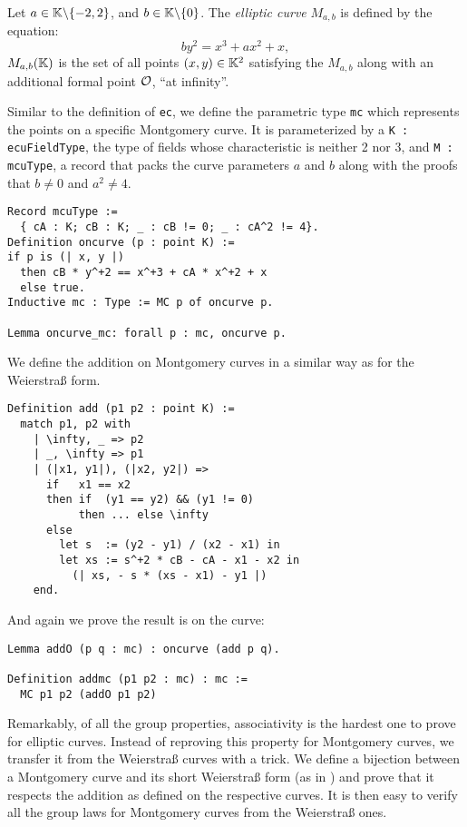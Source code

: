 \begin{dfn}
  Let $a \in \mathbb{K} \backslash \{-2, 2\}$, and $b \in \mathbb{K} \backslash \{ 0\}$.
  The \textit{elliptic curve} $M_{a,b}$ is defined by the equation:
  $$by^2 = x^3 + ax^2 + x,$$
  $M_{a,b}(\mathbb{K})$ is the set of all points $(x,y) \in \mathbb{K}^2$ satisfying the $M_{a,b}$
  along with an additional formal point $\mathcal{O}$, ``at infinity''.
\end{dfn}
Similar to the definition of \texttt{ec}, we define the parametric type \texttt{mc} which
represents the points on a specific Montgomery curve.
It is parameterized by
a \texttt{K : ecuFieldType}, the type of fields whose characteristic is neither
2 nor 3, and \texttt{M : mcuType}, a record that packs the curve
parameters $a$ and $b$ along with the proofs that $b \neq 0$ and $a^2 \neq 4$.
\begin{lstlisting}[language=Coq,belowskip=-0.1 \baselineskip]
Record mcuType :=
  { cA : K; cB : K; _ : cB != 0; _ : cA^2 != 4}.
Definition oncurve (p : point K) :=
if p is (| x, y |)
  then cB * y^+2 == x^+3 + cA * x^+2 + x
  else true.
Inductive mc : Type := MC p of oncurve p.

Lemma oncurve_mc: forall p : mc, oncurve p.
\end{lstlisting}
We define the addition on Montgomery curves in a similar way as for the Weierstra{\ss} form.
\begin{lstlisting}[language=Coq,belowskip=-0.25 \baselineskip]
Definition add (p1 p2 : point K) :=
  match p1, p2 with
    | \infty, _ => p2
    | _, \infty => p1
    | (|x1, y1|), (|x2, y2|) =>
      if   x1 == x2
      then if  (y1 == y2) && (y1 != 0)
           then ... else \infty
      else
        let s  := (y2 - y1) / (x2 - x1) in
        let xs := s^+2 * cB - cA - x1 - x2 in
          (| xs, - s * (xs - x1) - y1 |)
    end.
\end{lstlisting}
And again we prove the result is on the curve: %
\begin{lstlisting}[language=Coq]
Lemma addO (p q : mc) : oncurve (add p q).

Definition addmc (p1 p2 : mc) : mc :=
  MC p1 p2 (addO p1 p2)
\end{lstlisting}

Remarkably, of all the group properties, associativity is the hardest one to prove for elliptic curves.
Instead of reproving this property for Montgomery curves, we transfer it from the Weierstra{\ss} curves
with a trick.
We define a bijection between a Montgomery curve and its short Weierstra{\ss} form
(as in )
and prove that it respects the addition as defined on the respective curves.
It is then easy to verify all the group laws for Montgomery curves from the Weierstra{\ss} ones.

